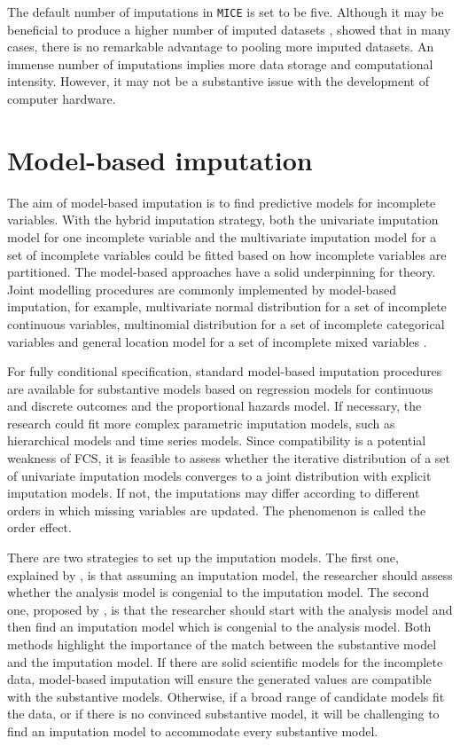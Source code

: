 The default number of imputations in \texttt{MICE} is set to be five. Although it may be beneficial to produce a higher number of imputed datasets \citep{royston2004multiple, graham2007many, bodner2008improves, white2011multiple}, \citet{schafer1998multiple} showed that in many cases, there is no remarkable advantage to pooling more imputed datasets. An immense number of imputations implies more data storage and computational intensity. However, it may not be a substantive issue with the development of computer hardware. 

\section{Model-based imputation}
The aim of model-based imputation is to find predictive models for incomplete variables. With the hybrid imputation strategy, both the univariate imputation model for one incomplete variable and the multivariate imputation model for a set of incomplete variables could be fitted based on how incomplete variables are partitioned. The model-based approaches have a solid underpinning for theory. Joint modelling procedures are commonly implemented by model-based imputation, for example, multivariate normal distribution for a set of incomplete continuous variables, multinomial distribution for a set of incomplete categorical variables and general location model for a set of incomplete mixed variables \citep{schafer1997analysis}. 

For fully conditional specification, standard model-based imputation procedures are available for substantive models based on regression models for continuous and discrete outcomes and the proportional hazards model. If necessary, the research could fit more complex parametric imputation models, such as hierarchical models and time series models. Since compatibility is a potential weakness of FCS, it is feasible to assess whether the iterative distribution of a set of univariate imputation models converges to a joint distribution with explicit imputation models. If not, the imputations may differ according to different orders in which missing variables are updated. The phenomenon is called the order effect. 

There are two strategies to set up the imputation models. The first one, explained by \citet{meng1994multiple}, is that assuming an imputation model, the researcher should assess whether the analysis model is congenial to the imputation model. The second one, proposed by \citet{bartlett2015multiple}, is that the researcher should start with the analysis model and then find an imputation model which is congenial to the analysis model. Both methods highlight the importance of the match between the substantive model and the imputation model. If there are solid scientific models for the incomplete data, model-based imputation will ensure the generated values are compatible with the substantive models. Otherwise, if a broad range of candidate models fit the data, or if there is no convinced substantive model, it will be challenging to find an imputation model to accommodate every substantive model. 

